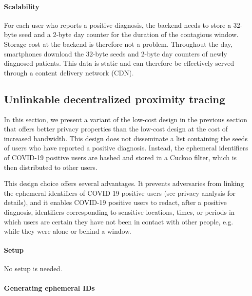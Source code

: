 \documentclass{article}
\begin{document}
\paragraph{Scalability}\label{scalability}

For each user who reports a positive diagnosis, the backend needs to
store a 32-byte seed and a 2-byte day counter for the duration of the
contagious window. Storage cost at the backend is therefore not a
problem. Throughout the day, smartphones download the 32-byte seeds and
2-byte day counters of newly diagnosed patients. This data is static and
can therefore be effectively served through a content delivery network
(CDN).


\subsection{Unlinkable decentralized proximity tracing}\label{unlinkable-decentralized-proximity-tracing}

In this section, we present a variant of the low-cost design in the
previous section that offers better privacy properties than the low-cost
design at the cost of increased bandwidth. This design does not
disseminate a list containing the seeds of users who have reported a
positive diagnosis. Instead, the ephemeral identifiers of COVID-19
positive users are hashed and stored in a Cuckoo filter, which is then
distributed to other users.

This design choice offers several advantages. It prevents adversaries
from linking the ephemeral identifiers of COVID-19 positive users (see
privacy analysis for details), and it enables COVID-19 positive users to
redact, after a positive diagnosis, identifiers corresponding to
sensitive locations, times, or periods in which users are certain they
have not been in contact with other people, e.g. while they were alone
or behind a window.

\hypertarget{setup-1}{%
\paragraph{Setup}\label{setup-1}}

No setup is needed.

\hypertarget{generating-ephemeral-ids}{%
\paragraph{Generating ephemeral IDs}\label{generating-ephemeral-ids}}
\end{document}
